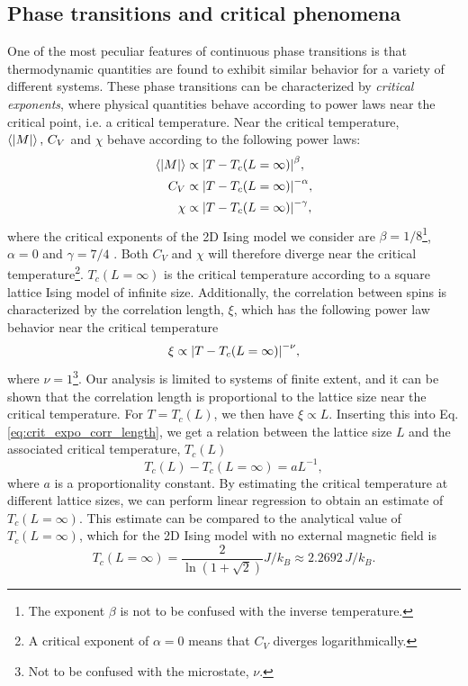 \subsection{Phase transitions and critical phenomena}\label{subsec_theory:PT_critical_phenomena}
One of the most peculiar features of continuous phase transitions is that thermodynamic quantities are found to exhibit similar behavior for a variety of different systems. These phase transitions can be characterized by \textit{critical exponents}, where physical quantities behave according to power laws near the critical point, i.e. a critical temperature. Near the critical temperature, $\expval{\abs{M}},\,C_V$ and $\chi$ behave according to the following power laws: 
\begin{align}
    \expval{\abs{M}} & \propto \abs{T - T_c(L=\infty)}^\beta, \label{eq:crit_expo_mag} \\
    C_V & \propto \abs{T - T_c(L=\infty)}^{-\alpha}, \label{eq:crit_expo_heatcap} \\ 
    \chi & \propto \abs{T - T_c(L=\infty)}^{-\gamma}, \label{eq:crit_expo_mag_susc}
\end{align}
where the critical exponents of the 2D Ising model we consider are $\beta=1/8$\footnote{The exponent $\beta$ is not to be confused with the inverse temperature.}, $\alpha=0$ and $\gamma=7/4$ \cite{crit_expo}. Both $C_V$ and $\chi$ will therefore diverge near the critical temperature\footnote{A critical exponent of $\alpha=0$ means that $C_V$ diverges logarithmically.}. $T_c(L=\infty)$ is the critical temperature according to a square lattice Ising model of infinite size. Additionally, the correlation between spins is characterized by the correlation length, $\xi$, which has the following power law behavior near the critical temperature 
\begin{equation}
    \xi \propto \abs{T - T_c(L=\infty)}^{-\nu}, \label{eq:crit_expo_corr_length}
\end{equation}
where $\nu=1$\footnote{Not to be confused with the microstate, $\nu$.}. Our analysis is limited to systems of finite extent, and it can be shown that the correlation length is proportional to the lattice size near the critical temperature\cite{lecture_notes}. For $T=T_c(L)$, we then have $\xi\propto L$. Inserting this into Eq. \eqref{eq:crit_expo_corr_length}, we get a relation between the lattice size $L$ and the associated critical temperature, $T_c(L)$
\begin{equation}
    T_c(L) - T_c(L=\infty) = aL^{-1}, \label{eq:finite_size_scaling_relation}
\end{equation}  
where $a$ is a proportionality constant. By estimating the critical temperature at different lattice sizes, we can perform linear regression to obtain an estimate of $T_c(L=\infty)$. This estimate can be compared to the analytical value of $T_c(L=\infty)$, which for the 2D Ising model with no external magnetic field is \cite{Onsager_Ising2D}
\begin{equation}
    T_c(L=\infty) = \frac{2}{\ln(1+\sqrt{2})} J/k_B \approx 2.2692\,J/k_B. \label{eq:onsager_critical_temperature}
\end{equation}


